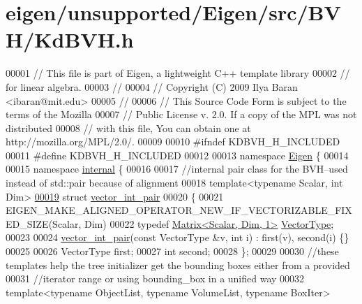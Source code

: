 \hypertarget{eigen_2unsupported_2_eigen_2src_2_b_v_h_2_kd_b_v_h_8h_source}{}\section{eigen/unsupported/\+Eigen/src/\+B\+V\+H/\+Kd\+B\+VH.h}
\label{eigen_2unsupported_2_eigen_2src_2_b_v_h_2_kd_b_v_h_8h_source}

\begin{DoxyCode}
00001 \textcolor{comment}{// This file is part of Eigen, a lightweight C++ template library}
00002 \textcolor{comment}{// for linear algebra.}
00003 \textcolor{comment}{//}
00004 \textcolor{comment}{// Copyright (C) 2009 Ilya Baran <ibaran@mit.edu>}
00005 \textcolor{comment}{//}
00006 \textcolor{comment}{// This Source Code Form is subject to the terms of the Mozilla}
00007 \textcolor{comment}{// Public License v. 2.0. If a copy of the MPL was not distributed}
00008 \textcolor{comment}{// with this file, You can obtain one at http://mozilla.org/MPL/2.0/.}
00009 
00010 \textcolor{preprocessor}{#ifndef KDBVH\_H\_INCLUDED}
00011 \textcolor{preprocessor}{#define KDBVH\_H\_INCLUDED}
00012 
00013 \textcolor{keyword}{namespace }\hyperlink{namespace_eigen}{Eigen} \{ 
00014 
00015 \textcolor{keyword}{namespace }\hyperlink{namespaceinternal}{internal} \{
00016 
00017 \textcolor{comment}{//internal pair class for the BVH--used instead of std::pair because of alignment}
00018 \textcolor{keyword}{template}<\textcolor{keyword}{typename} Scalar, \textcolor{keywordtype}{int} Dim>
\hyperlink{struct_eigen_1_1internal_1_1vector__int__pair}{00019} \textcolor{keyword}{struct }\hyperlink{struct_eigen_1_1internal_1_1vector__int__pair}{vector\_int\_pair}
00020 \{
00021 EIGEN\_MAKE\_ALIGNED\_OPERATOR\_NEW\_IF\_VECTORIZABLE\_FIXED\_SIZE(Scalar, Dim)
00022   \textcolor{keyword}{typedef} \hyperlink{group___core___module}{Matrix<Scalar, Dim, 1>} \hyperlink{group___core___module}{VectorType};
00023 
00024   \hyperlink{struct_eigen_1_1internal_1_1vector__int__pair}{vector\_int\_pair}(\textcolor{keyword}{const} VectorType &v, \textcolor{keywordtype}{int} i) : first(v), second(i) \{\}
00025 
00026   VectorType first;
00027   \textcolor{keywordtype}{int} second;
00028 \};
00029 
00030 \textcolor{comment}{//these templates help the tree initializer get the bounding boxes either from a provided}
00031 \textcolor{comment}{//iterator range or using bounding\_box in a unified way}
00032 \textcolor{keyword}{template}<\textcolor{keyword}{typename} ObjectList, \textcolor{keyword}{typename} VolumeList, \textcolor{keyword}{typename} BoxIter>

\end{DoxyCode}
